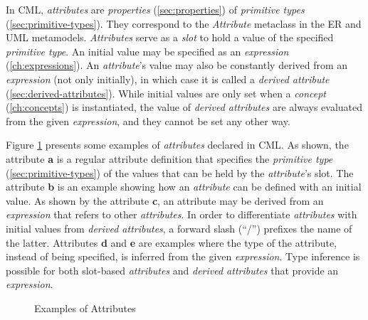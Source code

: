 \begin{definition}
In CML, \emph{attributes} are \emph{properties} (\ref{sec:properties})
of \emph{primitive types} (\ref{sec:primitive-types}).
They correspond to the \emph{Attribute} metaclass 
in the ER \cite{er} and UML \cite{uml} metamodels.
\emph{Attributes} serve as a \emph{slot} to hold a value of 
the specified \emph{primitive type}.
An initial value may be specified as an \emph{expression} (\ref{ch:expressions}).
An \emph{attribute}'s value may also be constantly
derived from an \emph{expression} (not only initially),
in which case it is called a \emph{derived attribute} (\ref{sec:derived-attributes}).
While initial values are only set when a \emph{concept} (\ref{ch:concepts})
is instantiated,
the value of \emph{derived attributes} are always evaluated 
from the given \emph{expression},
and they cannot be set any other way.
\end{definition}

\begin{examples}
Figure \ref{fig:ex:attributes} presents some examples of \emph{attributes} declared in CML.
As shown,
the attribute \textbf{a} is a regular attribute definition 
that specifies the \emph{primitive type} (\ref{sec:primitive-types})
of the values that can be held by the \emph{attribute}'s slot.
The attribute \textbf{b} is an example showing how an \emph{attribute}
can be defined with an initial value.
As shown by the attribute \textbf{c}, 
an attribute may be derived from an \emph{expression}
that refers to other \emph{attributes}.
In order to differentiate \emph{attributes} with initial values
from \emph{derived attributes},
a forward slash (``/'') prefixes the name of the latter.
Attributes \textbf{d} and \textbf{e} are examples
where the type of the attribute,
instead of being specified,
is inferred from the given \emph{expression}.
Type inference is possible for both slot-based \emph{attributes}
and \emph{derived attributes} that provide an \emph{expression}.
\end{examples}

\begin{figure}
\verbatimfont{\small}

\caption{Examples of Attributes}
\label{fig:ex:attributes}
\end{figure}
